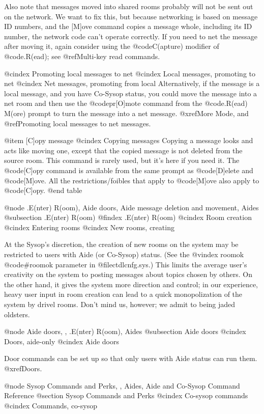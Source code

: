 Also note that messages moved into shared rooms probably
will not be sent out on the network.  We want to fix this,
but because networking is based on message ID numbers, and the
[M]ove command copies a message whole, including its ID
number, the network code can't operate correctly.  If you need
to net the message after moving it, again consider using the
@code{C(apture)} modifier of @code{.R(ead)}; see @ref{Multi-key read commands}.

@cindex Promoting local messages to net
@cindex Local messages, promoting to net
@cindex Net messages, promoting from local
Alternatively, if the message is a local message, and you have
Co-Sysop status, you could move the message into a net room and
then use the @code{pr[O]mote} command from the @code{.R(ead) M(ore)}
prompt to turn the message into a net message.
@xref{More Mode}, and @ref{Promoting local messages to net messages}.

@item [C]opy message
@cindex Copying messages
Copying a message looks and acts like moving one,
except that the copied message is not deleted from the source
room.  This command is rarely used, but it's here if you need
it.  The @code{[C]opy} command is available from the same prompt as
@code{[D]elete} and @code{[M]ove}.  All the restrictions/foibles that apply
to @code{[M]ove} also apply to @code{[C]opy}.
@end table

@node .E(nter) R(oom), Aide doors, Aide message deletion and movement, Aides
@subsection .E(nter) R(oom)
@findex .E(nter) R(oom)
@cindex Room creation
@cindex Entering rooms
@cindex New rooms, creating

At the Sysop's discretion, the creation of new rooms on the
system may be restricted to users with Aide (or Co-Sysop) status.  (See the
@vindex roomok
@code{#roomok} parameter in @file{ctdlcnfg.sys}.)  This limits the
average user's creativity on the system to posting messages about
topics chosen by others.  On the other hand, it gives the system more
direction and control; in our experience, heavy user input in room
creation can lead to a quick monopolization of the system by
drivel rooms.  Don't mind us, however; we admit to being jaded
oldsters.

@node Aide doors,  , .E(nter) R(oom), Aides
@subsection Aide doors
@cindex Doors, aide-only
@cindex Aide doors

Door commands can be set up so that only users with Aide
status can run them.  @xref{Doors}.

@node Sysop Commands and Perks,  , Aides, Aide and Co-Sysop Command Reference
@section Sysop Commands and Perks
@cindex Co-sysop commands
@cindex Commands, co-sysop

